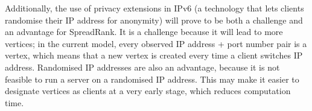 Additionally, the use of privacy extensions in IPv6 (a technology that lets clients randomise their IP address for anonymity) will prove to be both a challenge and an advantage for SpreadRank.
It is a challenge because it will lead to more vertices; in the current model, every observed IP address + port number pair is a vertex, which means that a new vertex is created every time a client switches IP address.
Randomised IP addresses are also an advantage, because it is not feasible to run a server on a randomised IP address.
This may make it easier to designate vertices as clients at a very early stage, which reduces computation time.
